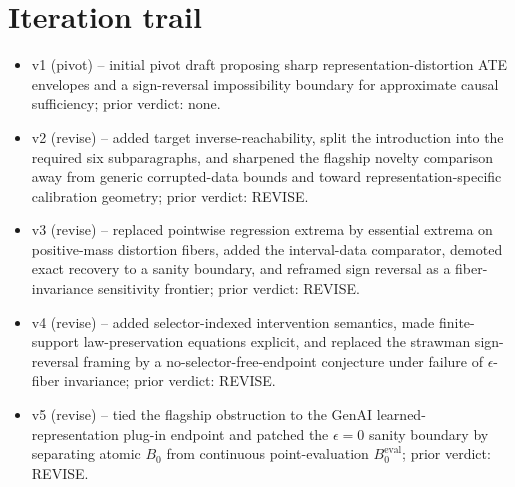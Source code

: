 \documentclass[11pt]{article}
\theoremstyle{definition}
\theoremstyle{plain}
\theoremstyle{remark}
\begin{document}
\section{Iteration trail}
\begin{itemize}[leftmargin=*]
\item v1 (pivot) -- initial pivot draft proposing sharp representation-distortion ATE envelopes and a sign-reversal impossibility boundary for approximate causal sufficiency; prior verdict: none.
\item v2 (revise) -- added target inverse-reachability, split the introduction into the required six subparagraphs, and sharpened the flagship novelty comparison away from generic corrupted-data bounds and toward representation-specific calibration geometry; prior verdict: REVISE.
\item v3 (revise) -- replaced pointwise regression extrema by essential extrema on positive-mass distortion fibers, added the \citet{ManskiTamer2002} interval-data comparator, demoted exact recovery to a sanity boundary, and reframed sign reversal as a fiber-invariance sensitivity frontier; prior verdict: REVISE.
\item v4 (revise) -- added selector-indexed intervention semantics, made finite-support law-preservation equations explicit, and replaced the strawman sign-reversal framing by a no-selector-free-endpoint conjecture under failure of \(\epsilon\)-fiber invariance; prior verdict: REVISE.
\item v5 (revise) -- tied the flagship obstruction to the GenAI learned-representation plug-in endpoint and patched the \(\epsilon=0\) sanity boundary by separating atomic \(B_0\) from continuous point-evaluation \(B^{\mathrm{eval}}_0\); prior verdict: REVISE.
\end{itemize}
\end{document}

